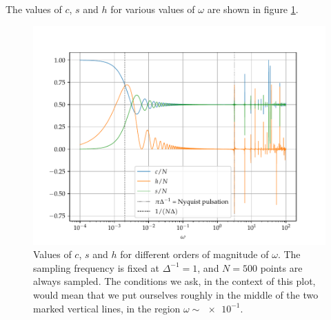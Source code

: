 \documentclass[main.tex]{subfiles}
\begin{document}
The values of \(c\), \(s\) and \(h\) for various values of \(\omega \) are shown in figure \ref{fig:large_pulsation}.

\begin{figure}[ht]
\centering
\includegraphics[width=\textwidth]{figures/large_pulsation}
\caption{Values of \(c\), \(s\) and \(h\) for different orders of magnitude of \(\omega \). The sampling frequency is fixed at \(\Delta^{-1} = 1\), and \(N=500\) points are always sampled. The conditions we ask, in the context of this plot, would mean that we put ourselves roughly in the middle of the two marked vertical lines, in the region \(\omega \sim \num{e-1}\).} 
\label{fig:large_pulsation}
\end{figure}


\end{document}
